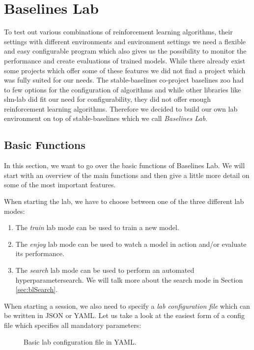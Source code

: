 \section{Baselines Lab} \label{sec:BaselinesLab}
To test out various combinations of reinforcement learning algorithms, their settings with different environments and environment settings we need a flexible and easy configurable program which also gives us the possibility to monitor the performance and create evaluations of trained models. While there already exist some projects which offer some of these features we did not find a project which was fully suited for our needs. The stable-baselines co-project baselines zoo \cite{rl-zoo} had to few options for the configuration of algorithms and while other libraries like slm-lab \cite{kenggraesser2017slmlab} did fit our need for configurability, they did not offer enough reinforcement learning algorithms. Therefore we decided to build our own lab environment on top of stable-baselines which we call \textit{Baselines Lab}.

\subsection{Basic Functions} \label{sec:blFunctions}
In this section, we want to go over the basic functions of Baselines Lab. We will start with an overview of the main functions and then give a little more detail on some of the most important features. 

When starting the lab, we have to choose between one of the three different lab modes:

\begin{enumerate}
    \item The \textit{train} lab mode can be used to train a new model.
    \item The \textit{enjoy} lab mode can be used to watch a model in action and/or evaluate its performance.
    \item The \textit{search} lab mode can be used to perform an automated hyperparametersearch. We will talk more about the search mode in Section \ref{sec:blSearch}.
\end{enumerate}

When starting a session, we also need to specify a \textit{lab configuration file} which can be written in JSON or YAML. Let us take a look at the easiest form of a config file which specifies all mandatory parameters:

\begin{figure}[h]
    
    \caption{Basic lab configuration file in YAML.}
\end{figure}


